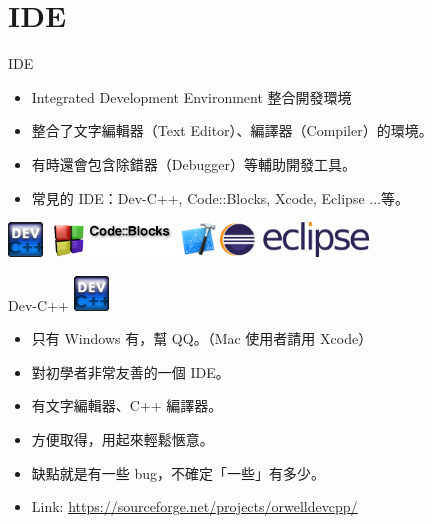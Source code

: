 \documentclass[t]{beamer}
\begin{document}
\section{IDE}
\begin{frame}{IDE}
  \begin{itemize}
    \item Integrated Development Environment 整合開發環境
    \item 整合了文字編輯器（Text Editor）、編譯器（Compiler）的環境。
    \item 有時還會包含除錯器（Debugger）等輔助開發工具。
    \item 常見的 IDE：Dev-C++, Code::Blocks, Xcode, Eclipse ...等。
  \end{itemize}
  \begin{center}
    \includegraphics[height=2.5em]{dev.png}
    \hspace{1em}
    \includegraphics[height=2.5em]{cb.png}
    \hspace{1em}
    \includegraphics[height=2.5em]{xcode.png}
    \hspace{1em}
    \includegraphics[height=2.5em]{eclipse.png}
  \end{center}
\end{frame}

\begin{frame}{Dev-C++}
  \vspace{0.5em}
  \hspace{2em}
  \includegraphics[height=2.5em]{dev.png}
  \vspace{0.5em}
  \begin{itemize}
    \item 只有 Windows 有，幫 QQ。（Mac 使用者請用 Xcode）
    \item 對初學者非常友善的一個 IDE。
    \item 有文字編輯器、C++ 編譯器。
    \item 方便取得，用起來輕鬆愜意。
    \item 缺點就是有一些 bug，不確定「一些」有多少。
    \item Link: \href{https://sourceforge.net/projects/orwelldevcpp/}{\underline{https://sourceforge.net/projects/orwelldevcpp/}}
  \end{itemize}
\end{frame}
\end{document}
